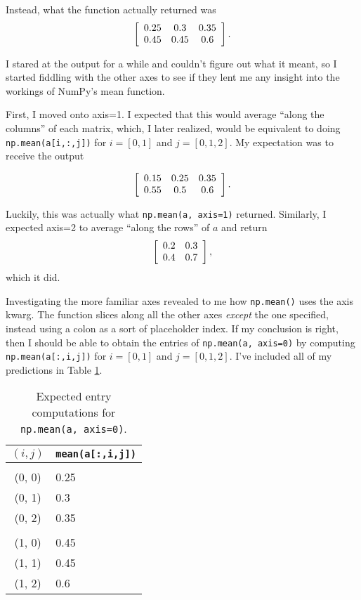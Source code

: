 \documentclass{article}
\begin{document}
Instead, what the function actually returned was
\[\left[
  \begin{array}[c]{ccc}
    0.25 & 0.3 & 0.35 \\
    0.45 & 0.45 & 0.6
  \end{array}
  \label{arr:axis0}
\right].\]

I stared at the output for a while and couldn't figure out what it
meant, so I started fiddling with the other axes to see if they lent
me any insight into the workings of NumPy's mean function.

First, I moved onto axis=1.  I expected that this would average
``along the columns'' of each matrix, which, I later realized, would
be equivalent to doing \verb|np.mean(a[i,:,j])| for $i=[0, 1]$ and
$j=[0, 1, 2]$. My expectation was to receive the output

\[\left[
  \begin{array}[c]{ccc}
    0.15 & 0.25 & 0.35 \\
    0.55 & 0.5 & 0.6
  \end{array}
\right].\]

Luckily, this was actually what \verb|np.mean(a, axis=1)| returned.
Similarly, I expected axis=2 to average ``along the rows'' of $a$ and
return
\[\left[
  \begin{array}[c]{cc}
    0.2 & 0.3 \\
    0.4 & 0.7
  \end{array}
\right],\]
which it did.

Investigating the more familiar axes revealed to me how
\verb|np.mean()| uses the axis kwarg.  The function slices along all
the other axes \emph{except} the one specified, instead using a colon
as a sort of placeholder index.  If my conclusion is right, then I
should be able to obtain the entries of \verb|np.mean(a, axis=0)| by
computing \verb|np.mean(a[:,i,j])| for $i=[0, 1]$ and $j=[0, 1, 2]$.
I've included all of my predictions in Table
\ref{tab:axis0predictions}.

\begin{table}
  \centering
  \begin{tabular}{|c|l|}
    \hline\hline
    $(i,j)$ & \verb|mean(a[:,i,j])| \\
    \hline \\ [-1.5ex]
    (0, 0) & 0.25 \\
    (0, 1) & 0.3 \\
    (0, 2) & 0.35\\ [0.5ex] \hline
    \\ [-1.75ex]
    (1, 0) & 0.45 \\
    (1, 1) & 0.45 \\
    (1, 2) & 0.6 \\ [0.5ex]
    \hline\hline
  \end{tabular}
  \caption{Expected entry computations for \texttt{np.mean(a,
      axis=0)}.}
\label{tab:axis0predictions}
\end{table}
\end{document}
